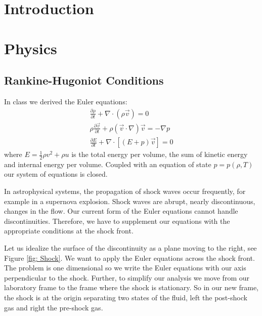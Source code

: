 \documentclass{article}
\begin{document}

\section{Introduction}

\section{Physics}
\subsection{Rankine-Hugoniot Conditions}
In class we derived the Euler equations:
\begin{gather}
\label{eq: continuity equation}
\frac{\partial\rho}{\partial t} +\nabla\cdot(\rho\vec{v})=0 \\
\label{eq: momentum equation}
\rho\frac{\partial\vec{v}}{\partial t}+\rho(\vec{v}\cdot\nabla)\vec{v}=-\nabla p \\
\label{eq: energy equation}
\frac{\partial E}{\partial t} + \nabla\cdot \left[ \left( E+p\right) \vec{v}\right]  = 0
\end{gather}
where $E=\frac{1}{2}\rho v^{2} + \rho u$ is the total energy per volume, the sum of kinetic energy and internal energy per volume. Coupled with an equation of state $p = p\left(\rho, T\right)$ our system of equations is closed.

In astrophysical systems, the propagation of shock waves occur frequently, for example in a supernova explosion. Shock waves are abrupt, nearly  discontinuous, changes in the flow. Our current form of the Euler equations cannot handle discontinuities. Therefore, we have to supplement our equations with the appropriate conditions at the shock front. 

Let us idealize the surface of the discontinuity as a plane moving to the right, see Figure \ref{fig: Shock}. We want to apply the Euler equations across the shock front. The problem is one dimensional so we write the Euler equations with our axis perpendicular to the shock. Further, to simplify our analysis we move from our laboratory frame to the frame where the shock is stationary. So in our new frame, the shock is at the origin separating two states of the fluid, left the post-shock gas and right the pre-shock gas.
\end{document}

